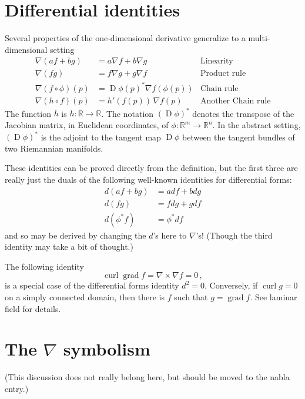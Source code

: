 \documentclass[12pt]{article}
\newcommand{\real}{\mathbb{R}}
\DeclareMathOperator{\D}{D}
\newcommand{\grad}{\operatorname{grad}}
\newcommand{\curl}{\operatorname{curl}}
\begin{document}
\section{Differential identities}
Several properties of the one-dimensional derivative generalize to a
multi-dimensional setting
\begin{align*}
\nabla(af+bg) &= a\nabla f + b\nabla g & \text{Linearity}\\
\nabla(fg) &= f\nabla g + g\nabla f & \text{Product rule}\\
\nabla( f \circ \phi ) (p) &= \D \phi(p)^* \nabla f(\phi(p)) & \text{Chain rule} \\
\nabla(h \circ f)(p) &= h'(f(p)) \, \nabla f(p) & \text{Another Chain rule} 
\end{align*}
The function $h$ is $h\colon \real \to \real$.
The notation $(\D \phi)^*$ denotes the transpose of the Jacobian matrix,
in Euclidean coordinates, of $\phi \colon \real^m \to \real^n$.
In the abstract setting, $(\D \phi)^*$ is the adjoint to the tangent map $\D \phi$
between the tangent bundles of two Riemannian manifolds.  


These identities can be proved directly from the definition,
but the first three are really just the duals
of the following well-known identities for differential forms:
\begin{align*}
d(af + bg) &= a df + b dg \\
d(fg) &= f dg + g df \\
d(\phi^* f) &= \phi^* df
\end{align*}
and so may be derived by changing the $d$'s here
to $\nabla$'s!  (Though the third identity may take a bit of thought.)

\smallskip

The following identity
\[
\curl \grad f = \nabla \times \nabla f = 0\,,
\]
is a special case of the differential forms identity $d^2 = 0$.
Conversely, if $\curl g = 0$ on a simply connected domain, then there
is $f$ such that $g = \grad f$.  See laminar field for details.


\section{The $\nabla$ symbolism}
(This discussion does not really belong here, but should be moved
to the nabla entry.)
\end{document}

